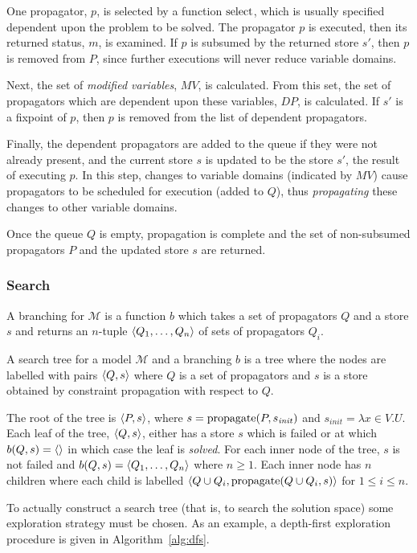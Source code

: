 One propagator, $p$, is selected by a function $\operatorname{select}$, which is usually specified dependent upon the problem to be solved. The propagator $p$ is executed, then its returned status, $m$, is examined. If $p$ is subsumed by the returned store $s'$, then $p$ is removed from $P$, since further executions will never reduce variable domains.

Next, the set of \textit{modified variables}, $\mathit{MV}$, is calculated. From this set, the set of propagators which are dependent upon these variables, $\mathit{DP}$, is calculated. If $s'$ is a fixpoint of $p$, then $p$ is removed from the list of dependent propagators. 

Finally, the dependent propagators are added to the queue if they were not already present, and the current store $s$ is updated to be the store $s'$, the result of executing $p$. In this step, changes to variable domains (indicated by $\mathit{MV}$) cause propagators to be scheduled for execution (added to $Q$), thus \textit{propagating} these changes to other variable domains.

Once the queue $Q$ is empty, propagation is complete and the set of non-subsumed propagators $P$ and the updated store $s$ are returned.

\subsubsection{Search}
A branching for $\mathscr{M}$ is a function $b$ which takes a set of propagators $Q$ and a store $s$ and returns an $n$-tuple $\left\langle Q_1,\ldots,Q_n\right\rangle$ of sets of propagators $Q_i$. 

A search tree for a model $\mathscr{M}$ and a branching $b$ is a tree where the nodes are labelled with pairs $\left\langle Q,s\right\rangle$ where $Q$ is a set of propagators and $s$ is a store obtained by constraint propagation with respect to $Q$.

The root of the tree is $\left\langle P,s\right\rangle$, where $s = \operatorname{propagate}(P,s_{\mathit{init}})$ and $s_{\mathit{init}} = \lambda x \in V . U$.
Each leaf of the tree, $\left\langle Q,s\right\rangle$, either has a store $s$ which is failed or at which $b(Q,s)=\left\langle \right\rangle$ in which case the leaf is \textit{solved}.
For each inner node of the tree, $s$ is not failed and $b(Q,s) = \left\langle Q_1,\ldots,Q_n\right\rangle$ where $n \geq 1$. 
Each inner node has $n$ children where each child is labelled $\left\langle Q \cup Q_i, \operatorname{propagate}(Q \cup Q_i,s)\right\rangle$ for $1 \leq i \leq n$.

To actually construct a search tree (that is, to search the solution space) some exploration strategy must be chosen. As an example, a depth-first exploration procedure is given in Algorithm~\ref{alg:dfs}.

